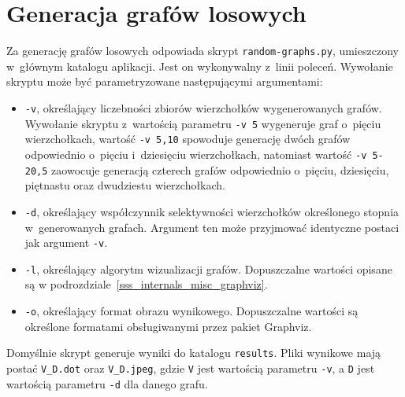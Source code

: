 \section{Generacja grafów losowych}
\par{
  Za generację grafów losowych odpowiada skrypt \texttt{random-graphs.py}, umieszczony w~głównym katalogu aplikacji.
  Jest on wykonywalny z~linii poleceń.
  Wywołanie skryptu może być parametryzowane następującymi argumentami:
  \begin{itemize}
    \item \texttt{-v}, określający liczebności zbiorów wierzchołków wygenerowanych grafów.
      Wywołanie skryptu z~wartością parametru \texttt{-v 5} wygeneruje graf o~pięciu wierzchołkach, wartość \texttt{-v 5,10} spowoduje generację dwóch grafów odpowiednio o~pięciu i~dziesięciu wierzchołkach, natomiast wartość \texttt{-v 5-20,5} zaowocuje generacją czterech grafów odpowiednio o~pięciu, dziesięciu, piętnastu oraz dwudziestu wierzchołkach.
    \item \texttt{-d}, określający współczynnik selektywności wierzchołków określonego stopnia w~generowanych grafach.
      Argument ten może przyjmować identyczne postaci jak argument \texttt{-v}.
    \item \texttt{-l}, określający algorytm wizualizacji grafów. Dopuszczalne wartości opisane są w podrozdziale~\ref{sss_internals_misc_graphviz}.
    \item \texttt{-o}, określający format obrazu wynikowego. Dopuszczalne wartości są określone formatami obsługiwanymi przez pakiet Graphviz.
  \end{itemize}

  Domyślnie skrypt generuje wyniki do katalogu \texttt{results}.
  Pliki wynikowe mają postać \texttt{V\_D.dot} oraz \texttt{V\_D.jpeg}, gdzie \texttt{V} jest wartością parametru \texttt{-v}, a  \texttt{D} jest wartością parametru \texttt{-d} dla danego grafu.
}
